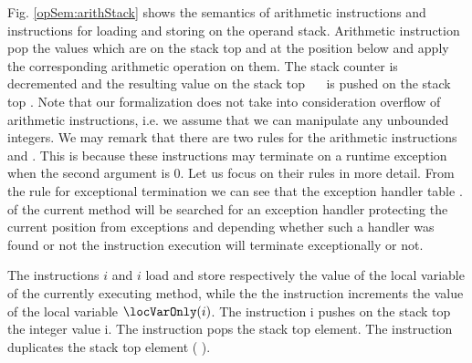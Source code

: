 Fig. \ref{opSem:arithStack}  shows the semantics of  arithmetic instructions and instructions for loading and storing on the operand stack. 
 Arithmetic instruction pop the values which are on the stack top \stackOnlyParam{\counterOnly}  and   at the position below
 and apply the corresponding arithmetic operation on them.
 The stack counter is decremented and  the resulting  value on the stack top  \ \op \ \stackOnlyParam{\counterOnly}
 is pushed on the stack  top  . Note that our formalization does not take into consideration overflow of arithmetic instructions, i.e.
 we assume that we can manipulate any unbounded integers.  
 We may remark that there are two rules  for the arithmetic instructions   and . This is because these instructions
 may terminate on a runtime exception when the second argument is 0. Let us focus on their rules in more detail. 
  From the rule for exceptional termination
 we can see that the exception handler table \methodd.\excHandlerTable{} of the current method will be searched 
for an exception handler protecting the current position \pc{} from \ArithExc{} exceptions and depending whether such a handler was
found or not the instruction execution will terminate exceptionally or not. 

  The instructions \load{} $i$ and \store{} $i$  load and store  respectively the value  of the 
  local variable of the currently executing method, while the 
  the instruction \iinc{} increments the value of the local variable $\locVarOnly(i)$.   
  The instruction  \push{} \textrm{i} pushes on the stack top the integer value \textrm{i}.
  The instruction \pop{} pops the stack top element. The instruction \dup{} duplicates the stack top element  \stackOnly( \counterOnly ).  



